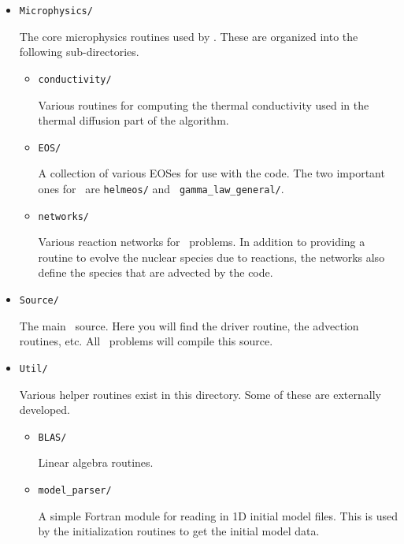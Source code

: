 \begin{itemize}
\begin{itemize}
\begin{itemize}
    \end{itemize}

  \item {\tt Microphysics/}

    The core microphysics routines used by \maestro.  These are organized
    into the following sub-directories.

    \begin{itemize}
    \item {\tt conductivity/}

      Various routines for computing the thermal conductivity used in
      the thermal diffusion part of the algorithm.

    \item {\tt EOS/}

      A collection of various EOSes for use with the code.  The two
      important ones for \maestro\ are {\tt helmeos/} and {\tt
        gamma\_law\_general/}.

    \item {\tt networks/}

      Various reaction networks for \maestro\ problems.  In addition
      to providing a routine to evolve the nuclear species due to
      reactions, the networks also define the species that are
      advected by the code.

    \end{itemize}


  \item {\tt Source/}

    The main \maestro\ source.  Here you will find the driver routine,
    the advection routines, etc.  All \maestro\ problems will compile
    this source.


  \item {\tt Util/}

    Various helper routines exist in this directory.  Some of these
    are externally developed.

    \begin{itemize}

    \item {\tt BLAS/}

      Linear algebra routines.

    \item {\tt model\_parser/}

      A simple Fortran module for reading in 1D initial model files.
      This is used by the initialization routines to get the initial
      model data.


\end{itemize}
\end{itemize}
\end{itemize}
